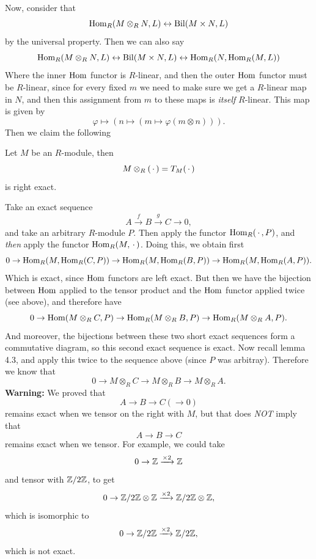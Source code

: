 \documentclass{article}
\begin{document}
\hspace{0.1cm} \gap
Now, consider that \[ 
    \operatorname{Hom}_{R}(M \otimes_{R} N, L) \leftrightarrow \operatorname{Bil}(M\times N, L)\] 
by the universal property. Then we can also say 
\[ \operatorname{Hom}_{R}(M \otimes_{R} N, L) \leftrightarrow \operatorname{Bil}(M \times N, L) \leftrightarrow \operatorname{Hom}_{R}(N, \operatorname{Hom}_{R}(M,L))\]
Where the inner $\operatorname{Hom}$ functor is $R$-linear, and then the outer $\operatorname{Hom}$ functor must be $R$-linear, since for every fixed $m$ we need to make sure we get a $R$-linear map in $N$, and then this assignment from $m$ to these maps is \textit{itself} $R$-linear. \newlec This map is given by \[ \varphi \mapsto (n \mapsto (m \mapsto \varphi (m \otimes n))). \] Then we claim the following 
\begin{fancyprop}{}
    Let $M$ be an $R$-module, then \[ M \otimes_{R} ( \, \cdot \, ) = T_{M}(\, \cdot \,) \] is right exact.
\end{fancyprop}
\proof Take an exact sequence \[A \xrightarrow{f} B \xrightarrow{g} C \rightarrow 0, \] and take an arbitrary $R$-module $P$. Then apply the functor $\operatorname{Hom}_{R}(\, \cdot \,, P)$, and \textit{then} apply the functor $\operatorname{Hom}_{R}(M, \, \cdot \,)$. Doing this, we obtain first \[ 0 \rightarrow \operatorname{Hom}_{R}(M,\operatorname{Hom}_{R}(C,P)) \rightarrow \operatorname{Hom}_{R}(M,\operatorname{Hom}_{R}(B,P)) \rightarrow \operatorname{Hom}_{R}(M,\operatorname{Hom}_{R}(A,P)).\]
Which is exact, since $\operatorname{Hom}$ functors are left exact. But then we have the bijection between $\operatorname{Hom}$ applied to the tensor product and the $\operatorname{Hom}$ functor applied twice (see above), and therefore have \[ 0 \rightarrow \operatorname{Hom}(M \otimes_{R} C, P) \rightarrow \operatorname{Hom}_{R}(M \otimes_{R} B, P) \rightarrow \operatorname{Hom}_{R}(M \otimes_{R} A, P).\]
And moreover, the bijections between these two short exact sequences form a commutative diagram, so this second exact sequence is exact. Now recall lemma 4.3, and apply this twice to the sequence above (since $P$ was arbitray). Therefore we know that \[ 0 \rightarrow M \otimes_R C \rightarrow M \otimes_R B \rightarrow M \otimes_R A.\] \endproof 
\textbf{Warning: } We proved that \[ A \rightarrow B \rightarrow C (\rightarrow 0) \] remains exact when we tensor on the right with $M$, but that does \textit{NOT} imply that \[A \rightarrow B \rightarrow C\] remains exact when we tensor. For example, we could take \[ 0 \rightarrow \mathbb{Z} \xrightarrow{\times 2} \mathbb{Z}\] and tensor with $\mathbb{Z}/2\mathbb{Z}$, to get \[ 0 \rightarrow \mathbb{Z} / 2\mathbb{Z} \otimes \mathbb{Z} \xrightarrow{\times 2} \mathbb{Z} / 2\mathbb{Z} \otimes \mathbb{Z},\] which is isomorphic to \[ 0 \rightarrow \mathbb{Z} / 2\mathbb{Z} \xrightarrow{\times 2} \mathbb{Z} /2\mathbb{Z}, \] which is not exact.
\end{document}
